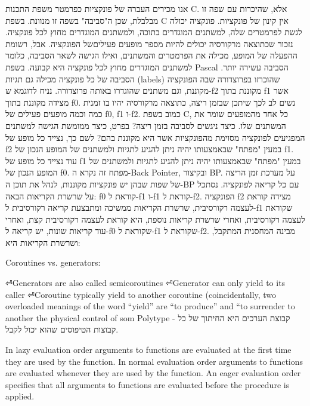         אנו מכירים העברה של פונקציות כפרמטר משפת התכנות C. אלא, שהיכרות עם שפה זו
        מבלבלת, שכן ה"סביבה" בשפה זו מנוונת. בשפת C אין קינון של פונקציות. פונקציה
        יכולה לגשת לפרמטרים שלה, למשתנים המוגדרים בתוכה, ולמשתנים המוגדרים מחוץ לכל
        פונקציה. נזכור שכתוצאה מרקורסיה יכולים להיות מספר מופעים פעיליםשל הפונקציה.
        אבל, רשומת ההפעלה של המופע, מכילה את הפרמטרים והמשתנים, ואילו הגישה לשאר
        הסביבה, כלומר למשתנים המוגדרים מחוץ לכל פונקציה היא קבועה. בשפת Pascal הסביבה
        עשירה יותר. הסביבה של כל פונקציה מכילה גם תגיות (labels) שהוכרזו בפרוצדורה שבה
        הפונקציה מקוננת, וגם משתנים שהוגדרו באותה פרוצדורה. נניח לדוגמא ש-f2 מקוננת
        בתוך f1 אשר מצידה מקוננת בתוך f0. נשים לב לכך שיתכן שבזמן ריצה, כתוצאה מרקורסיה
        יהיו בו זמנית כמה וכמה מופעים פעילים של f0, f1 ו-f2. כמוב בשפת C, כל אחד
        מהמופעים שומר את המשתנים שלו.
        כיצד ניגשים לסביבה בזמן ריצה? בפרט, כיצד ממומשת הגישה למשתנים המפגיעים לפונקציה מסוימת מהפונקציות אשר היא מקוננת בהם? לשם כך, נצייד כל מופע של f2 במעין "מפתח" שבאמצעותו יהיה ניתן להגיע לתגיות ולמשתנים של המופע הנכון של f1. עוד נצייד כל מופע של f1 במעין "מפתח" שבאמצעותו יהיה ניתן להגיע לתגיות ולמשתנים של המופע הנכון של f0.
        מפתח זה נקרא ה-Back Pointer, ובקיצור BP. על מערכת זמן הריצה של שפות שבהן יש פונקציות מקוננות, לנהל את תוכן ה-BP עם כל קריאה לפונקציה.
        נסתכל על שרשרת הקריאות הבאה: f0 קוראת ל-f1 ו-f1 קוראת ל-f2. הפונקציה f2 מצידה קוראת לעצמה רקורסיבית, שרשרת הקריאות ממשיכה ומתבצעת קריאה רקורסיבית ל-f1 שקוראת לעצמה רקורסיבית, ואחרי שרשרת קריאות נוספת, היא קוראת לעצמה רקורסיבית קצת, ואחרי עוד קריאות שונות, יש קריאה ל-f0 שקוראת ל-f1 שקוראת ל-f2.
        מבינה המחסנית המתקבל, ושרשרת הקריאות היא:

        Coroutines vs. generators:
        \begin{ציינון}
⏎Generators are also called semicoroutines
⏎Generator can only yield to its caller
⏎Coroutine typically yield to another coroutine (coincidentally, two overloaded meanings of the word “yield” are “to produce” and “to surrender to another the physical control of som
        Polytype - קבוצת הערכים היא החיתוך של כל קבוצות הטיפוסים שהוא יכול לקבל.
    \end{ציינון}

        In lazy evaluation order arguments to functions are
        evaluated at the first time they are used by the function.
        In normal evaluation order arguments to functions are
        evaluated whenever they are used by the function.
        An eager evaluation order specifies that all arguments
        to functions are evaluated before the procedure is applied.

